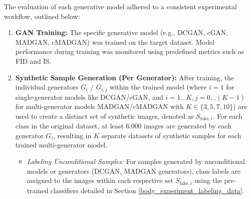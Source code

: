 The evaluation of each generative model adhered to a consistent experimental workflow, outlined below:

\begin{enumerate}
    \item \textbf{GAN Training:} The specific generative model (e.g., DCGAN, cGAN, MADGAN, cMADGAN) was trained on the target dataset. Model performance during training was monitored using predefined metrics such as FID and IS.

    \item \textbf{Synthetic Sample Generation (Per Generator):} After training, the individual generators \(G_i\) / \(G_{i, j}\) within the trained model (where \(i=1\) for single-generator models like DCGAN/cGAN, and \(i=1...K, j=0...(K-1)\) for multi-generator models MADGAN/cMADGAN with \(K \in \{3, 5, 7, 10\}\)) are used to create a distinct set of synthetic images, denoted as \(S_{\text{fake}, i}\). For each class in the original dataset, at least $6.000$ images are generated by each generator \(G_i\), resulting in \(K\) separate datasets of synthetic samples for each trained multi-generator model.
        \begin{itemize}
            \item \textit{Labeling Unconditional Samples:} For samples generated by unconditional models or generators (DCGAN, MADGAN generators), class labels are assigned to the images within each respective set \(S_{\text{fake}, i}\) using the pre-trained classifiers detailed in Section \ref{body_experiment_labeling_data}.
        \end{itemize}


\end{enumerate}
